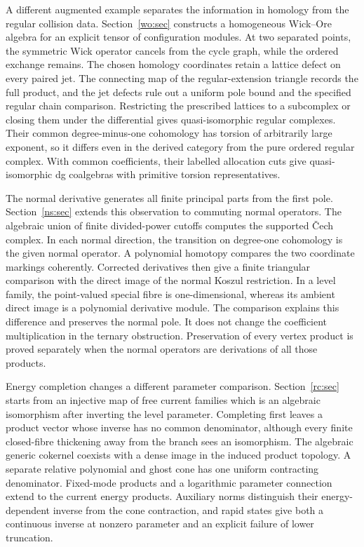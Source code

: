 \documentclass[11pt,reqno]{amsart}
\theoremstyle{definition}
\theoremstyle{remark}
\begin{document}
A different augmented example separates the information in homology
from the regular collision data.  Section~\ref{wo:sec} constructs a
homogeneous Wick--Ore algebra for an explicit tensor of configuration
modules.  At two separated points, the symmetric Wick operator cancels
from the cycle graph, while the ordered exchange remains.  The chosen
homology coordinates retain a lattice defect on every paired jet.
The connecting map of the regular-extension triangle records the full
product, and the jet defects rule out a uniform pole bound and the
specified regular chain comparison.
Restricting the prescribed lattices to a subcomplex or closing them under
the differential gives quasi-isomorphic regular complexes.  Their common
degree-minus-one cohomology has torsion of arbitrarily large exponent,
so it differs even in the derived category from the pure ordered regular
complex.  With common coefficients, their labelled allocation cuts give
quasi-isomorphic dg coalgebras with primitive torsion representatives.

The normal derivative generates all finite principal parts from the
first pole.  Section~\ref{ns:sec} extends this observation to commuting
normal operators.  The algebraic union of finite divided-power cutoffs
computes the supported \v{C}ech complex.  In each normal direction,
the transition on degree-one cohomology is the given normal operator.
A polynomial homotopy compares the two coordinate markings coherently.
Corrected derivatives then give a finite triangular
comparison with the direct image of the normal Koszul restriction.
In a level family, the point-valued special fibre is one-dimensional,
whereas its ambient direct image is a polynomial derivative module.
The comparison explains this difference and preserves the normal pole.
It does not change the coefficient multiplication in the ternary
obstruction.  Preservation of every vertex product is proved separately
when the normal operators are derivations of all those products.

Energy completion changes a different parameter comparison.
Section~\ref{rc:sec} starts from an injective map of free current
families which is an algebraic isomorphism after inverting the level
parameter.  Completing first leaves a product vector whose inverse
has no common denominator, although every finite closed-fibre thickening away from
the branch sees an isomorphism.  The algebraic generic cokernel
coexists with a dense image in the induced product topology.
A separate relative polynomial and ghost cone has one uniform
contracting denominator.  Fixed-mode products and a logarithmic
parameter connection extend to the current energy products.
Auxiliary norms distinguish their energy-dependent inverse from
the cone contraction, and rapid states give both a continuous
inverse at nonzero parameter and an explicit failure of lower
truncation.
\end{document}
